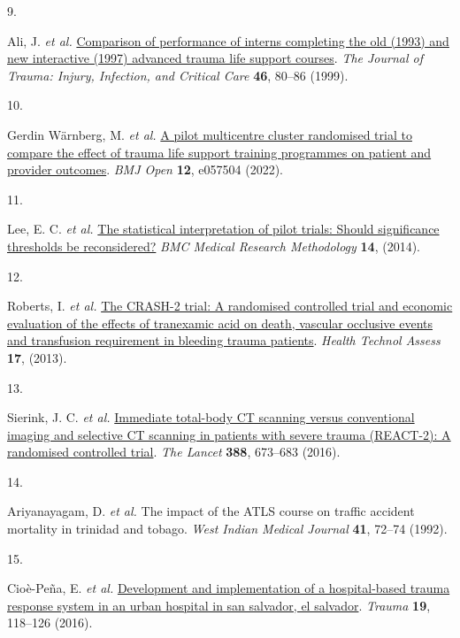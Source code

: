 \documentclass[
]{article}
\newlength{\cslhangindent}
\newlength{\csllabelwidth}
\newlength{\cslentryspacingunit} %
\newenvironment{CSLReferences}[2] %
 {%
  \setlength{\parindent}{0pt}
  \ifodd #1
  \let\oldpar\par
  \def\par{\hangindent=\cslhangindent\oldpar}
  \fi
  \setlength{\parskip}{#2\cslentryspacingunit}
 }%
 {}
\newcommand{\CSLLeftMargin}[1]{\parbox[t]{\csllabelwidth}{#1}}
\newcommand{\CSLRightInline}[1]{\parbox[t]{\linewidth - \csllabelwidth}{#1}\break}
\begin{document}
\begin{CSLReferences}{0}{0}
\leavevmode{}%
\CSLLeftMargin{9. }
\CSLRightInline{Ali, J. \emph{et al.} \href{https://doi.org/10.1097/00005373-199901000-00013}{Comparison of performance of interns completing the old (1993) and new interactive (1997) advanced trauma life support courses}. \emph{The Journal of Trauma: Injury, Infection, and Critical Care} \textbf{46}, 80--86 (1999).}

\leavevmode{}%
\CSLLeftMargin{10. }
\CSLRightInline{Gerdin Wärnberg, M. \emph{et al.} \href{https://doi.org/10.1136/bmjopen-2021-057504}{A pilot multicentre cluster randomised trial to compare the effect of trauma life support training programmes on patient and provider outcomes}. \emph{BMJ Open} \textbf{12}, e057504 (2022).}

\leavevmode{}%
\CSLLeftMargin{11. }
\CSLRightInline{Lee, E. C. \emph{et al.} \href{https://doi.org/10.1186/1471-2288-14-41}{The statistical interpretation of pilot trials: Should significance thresholds be reconsidered?} \emph{BMC Medical Research Methodology} \textbf{14}, (2014).}

\leavevmode{}%
\CSLLeftMargin{12. }
\CSLRightInline{Roberts, I. \emph{et al.} \href{https://doi.org/10.3310/hta17100}{The CRASH-2 trial: A randomised controlled trial and economic evaluation of the effects of tranexamic acid on death, vascular occlusive events and transfusion requirement in bleeding trauma patients}. \emph{Health Technol Assess} \textbf{17}, (2013).}

\leavevmode{}%
\CSLLeftMargin{13. }
\CSLRightInline{Sierink, J. C. \emph{et al.} \href{https://doi.org/10.1016/s0140-6736(16)30932-1}{Immediate total-body CT scanning versus conventional imaging and selective CT scanning in patients with severe trauma (REACT-2): A randomised controlled trial}. \emph{The Lancet} \textbf{388}, 673--683 (2016).}

\leavevmode{}%
\CSLLeftMargin{14. }
\CSLRightInline{Ariyanayagam, D. \emph{et al.} The impact of the ATLS course on traffic accident mortality in trinidad and tobago. \emph{West Indian Medical Journal} \textbf{41}, 72--74 (1992).}

\leavevmode{}%
\CSLLeftMargin{15. }
\CSLRightInline{Cioè-Peña, E. \emph{et al.} \href{https://doi.org/10.1177/1460408616672491}{Development and implementation of a hospital-based trauma response system in an urban hospital in san salvador, el salvador}. \emph{Trauma} \textbf{19}, 118--126 (2016).}


\end{CSLReferences}
\end{document}
